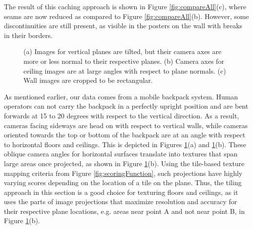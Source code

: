 \documentclass[]{spie}  %
\begin{document}
The result of this caching approach is shown in Figure
\ref{fig:compareAll}(c), where seams are now reduced as compared to
Figure \ref{fig:compareAll}(b). However, some discontinuities are
still present, as visible in the posters on the wall with breaks in
their borders.

\begin{figure}
  \centering
  \centering
  \centering
  \caption{(a) Images for vertical planes are tilted, but their camera
    axes are more or less normal to their respective planes. (b)
    Camera axes for ceiling images are at large angles with respect to
    plane normals. (c) Wall images are cropped to be rectangular.}
  \label{fig:projectionAngles}
\end{figure}


As mentioned earlier, our data comes from a mobile backpack
system. Human operators can not carry the backpack in a perfectly
upright position and are bent forwards at 15 to 20 degrees with
respect to the vertical direction. As a result, cameras facing
sideways are head on with respect to vertical walls, while cameras
oriented towards the top or bottom of the backpack are at an angle
with respect to horizontal floors and ceilings. This is depicted in
Figures \ref{fig:projectionAngles}(a) and
\ref{fig:projectionAngles}(b). These oblique camera angles for
horizontal surfaces translate into textures that span large areas once
projected, as shown in Figure \ref{fig:projectionAngles}(b). Using the
tile-based texture mapping criteria from Figure
\ref{fig:scoringFunction}, such projections have highly varying scores
depending on the location of a tile on the plane. Thus, the tiling
approach in this section is a good choice for texturing floors and
ceilings, as it uses the parts of image projections that maximize
resolution and accuracy for their respective plane locations,
e.g. areas near point A and not near point B, in Figure
\ref{fig:projectionAngles}(b).
\end{document}
